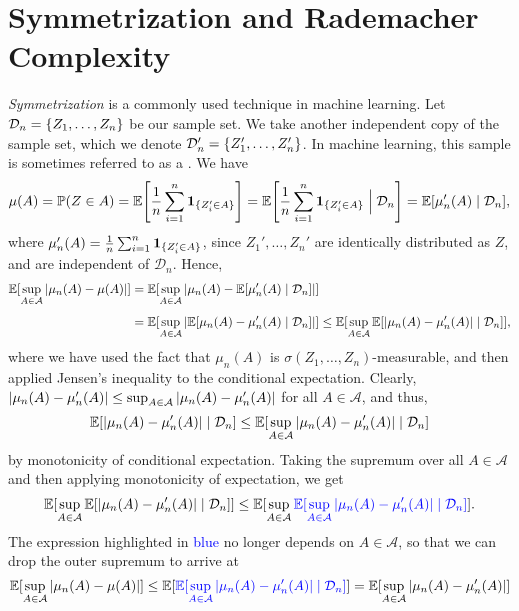 \section{Symmetrization and Rademacher Complexity}
\label{sec: symmetrization}

\emph{Symmetrization} is a commonly used technique in machine learning. Let $\mathcal{D}_n = \set{Z_1, \dots, Z_n}$ be our sample set. We take another independent copy of the sample set, which we denote $\mathcal{D}_n' = \set{Z_1', \dots, Z_n'}$. In machine learning, this sample is sometimes referred to as a . We have
\[
    \mu(A) = \Prob(Z \in A) = \Exp\left[\frac{1}{n} \sum_{i=1}^n \ind{\{Z_i' \in A\}}\right] = \Exp\left[\frac{1}{n} \sum_{i=1}^n \ind{\{Z_i' \in A\}} \given[\Big] \mathcal{D}_n\right] = \Exp[\mu_n'(A) \given \mathcal{D}_n],
\]
where $\mu_n'(A) = \frac{1}{n} \sum_{i=1}^n \mathbf{1}_{\{Z_i' \in A\}}$, since $Z_1', \dots, Z_n'$ are identically distributed as $Z$, and are independent of $\mathcal{D}_n$. Hence,
\begin{align*}
    \Exp[\sup_{A \in \mathcal{A}} \abs{\mu_n(A) - \mu(A)}] &= \Exp[\sup_{A \in \mathcal{A}} \abs*{\mu_n(A) - \Exp[\mu_n'(A) \given \mathcal{D}_n]}] \\[4pt]
    &= \Exp[\sup_{A \in \mathcal{A}} \abs*{\Exp[\mu_n(A) - \mu_n'(A) \given \mathcal{D}_n]}] \leq \Exp[\sup_{A \in \mathcal{A}} \Exp[\abs*{\mu_n(A) - \mu_n'(A)} \given \mathcal{D}_n]],
\end{align*}
where we have used the fact that $\mu_n(A)$ is $\sigma(Z_1, \dots, Z_n)$-measurable, and then applied Jensen's inequality to the conditional expectation. Clearly, $\abs*{\mu_n(A) - \mu_n'(A)} \leq \sup_{A \in \mathcal{A}} \abs*{\mu_n(A) - \mu_n'(A)}$ for all $A \in \mathcal{A}$, and thus,
\[
    \Exp[\abs*{\mu_n(A) - \mu_n'(A)} \given \mathcal{D}_n] \leq \Exp[\sup_{A \in \mathcal{A}} \abs*{\mu_n(A) - \mu_n'(A)} \given \mathcal{D}_n]
\]
by monotonicity of conditional expectation. Taking the supremum over all $A \in \mathcal{A}$ and then applying monotonicity of expectation, we get
\[
    \Exp[\sup_{A \in \mathcal{A}} \Exp[\abs*{\mu_n(A) - \mu_n'(A)} \given \mathcal{D}_n]] \leq \Exp[\sup_{A \in \mathcal{A}} {\color{blue} \Exp[\sup_{A \in \mathcal{A}} \abs*{\mu_n(A) - \mu_n'(A)} \given \mathcal{D}_n]}].
\]
The expression highlighted in \textcolor{blue}{blue} no longer depends on $A \in \mathcal{A}$, so that we can drop the outer supremum to arrive at
\[
    \Exp[\sup_{A \in \mathcal{A}} \abs{\mu_n(A) - \mu(A)}] \leq \Exp[{\color{blue} \Exp[\sup_{A \in \mathcal{A}} \abs*{\mu_n(A) - \mu_n'(A)} \given \mathcal{D}_n]}] = \Exp[\sup_{A \in \mathcal{A}} \abs*{\mu_n(A) - \mu_n'(A)}]
\]
